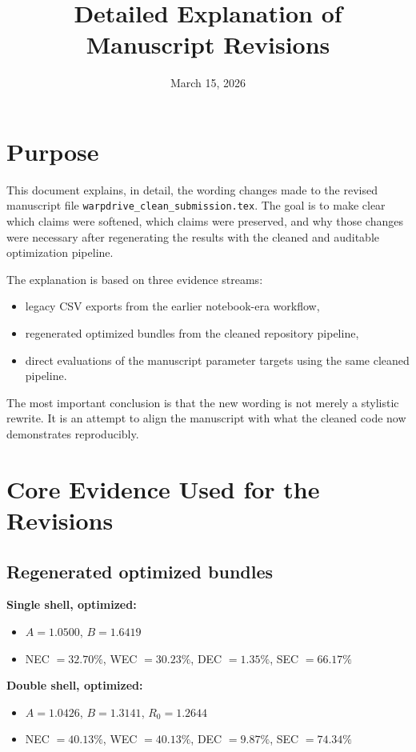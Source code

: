 \documentclass[11pt]{article}
\title{Detailed Explanation of Manuscript Revisions}
\author{}
\date{March 15, 2026}
\begin{document}
\maketitle

\section*{Purpose}
This document explains, in detail, the wording changes made to the revised manuscript file
\texttt{warpdrive\_clean\_submission.tex}. The goal is to make clear which claims were softened,
which claims were preserved, and why those changes were necessary after regenerating the results
with the cleaned and auditable optimization pipeline.

The explanation is based on three evidence streams:
\begin{itemize}[leftmargin=*]
\item legacy CSV exports from the earlier notebook-era workflow,
\item regenerated optimized bundles from the cleaned repository pipeline,
\item direct evaluations of the manuscript parameter targets using the same cleaned pipeline.
\end{itemize}

The most important conclusion is that the new wording is not merely a stylistic rewrite. It is an
attempt to align the manuscript with what the cleaned code now demonstrates reproducibly.

\section*{Core Evidence Used for the Revisions}
\subsection*{Regenerated optimized bundles}
\textbf{Single shell, optimized:}
\begin{itemize}[leftmargin=*]
\item $A = 1.0500$, $B = 1.6419$
\item NEC $= 32.70\%$, WEC $= 30.23\%$, DEC $= 1.35\%$, SEC $= 66.17\%$
\end{itemize}

\textbf{Double shell, optimized:}
\begin{itemize}[leftmargin=*]
\item $A = 1.0426$, $B = 1.3141$, $R_0 = 1.2644$
\item NEC $= 40.13\%$, WEC $= 40.13\%$, DEC $= 9.87\%$, SEC $= 74.34\%$
\end{itemize}
\end{document}
